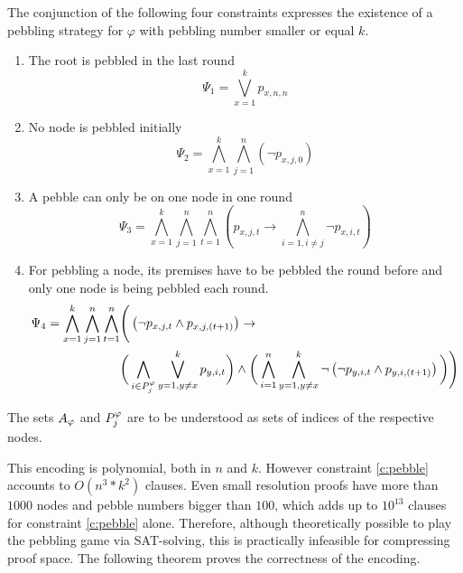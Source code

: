 \begin{definition}[Pebbling SAT encoding]
The conjunction of the following four constraints expresses the existence of a pebbling strategy for $\varphi$ with pebbling number smaller or equal $k$.

\begin{enumerate}
	\item The root is pebbled in the last round
				$$\Psi_1 = \bigvee_{x = 1}^k p_{x,n,n}$$
				
	\item No node is pebbled initially\\
				$$\Psi_2 = \bigwedge_{x = 1}^k \bigwedge_{j = 1}^n \left(\neg p_{x,j,0} \right)$$

	\item A pebble can only be on one node in one round
				$$\Psi_3 = \bigwedge_{x = 1}^k \bigwedge_{j = 1}^n \bigwedge_{t = 1}^n \left( p_{x,j,t} \rightarrow \bigwedge_{i = 1, i \neq j}^n \neg p_{x,i,t} \right)$$ 
				
	\item \label{c:pebble} For pebbling a node, its premises have to be pebbled the round before and only one node is being pebbled each round.\\
				\begin{align*}
					\Psi_4 = \bigwedge_{x = 1}^k \bigwedge_{j = 1}^n \bigwedge_{t = 1}^n & \Bigg( \left(\neg p_{x,j,t} \wedge p_{x,j,(t+1)} \right)\rightarrow \\
					&\bigg( \bigwedge_{i \in P_{j}^{\varphi}} \bigvee_{y = 1, y \neq x}^k p_{y,i,t} \bigg) \wedge 
					\bigg( \bigwedge_{i = 1}^n \bigwedge_{y = 1, y \neq x}^k \neg \left( \neg p_{y,i,t} \wedge p_{y,i,(t+1)} \right) \bigg) \Bigg)
				\end{align*}
				
\end{enumerate}

The sets $A_{\varphi}$ and $P_{j}^{\varphi}$ are to be understood as sets of indices of the respective nodes.

\end{definition}

\noindent
This encoding is polynomial, both in $n$ and $k$. However constraint \ref{c:pebble} accounts to $O(n^3*k^2)$ clauses. 
Even small resolution proofs have more than $1000$ nodes and pebble numbers bigger than $100$, which adds up to $10^{13}$ clauses for constraint \ref{c:pebble} alone. 
Therefore, although theoretically possible to play the pebbling game via SAT-solving, this is practically infeasible for compressing proof space.
The following theorem proves the correctness of the encoding.

